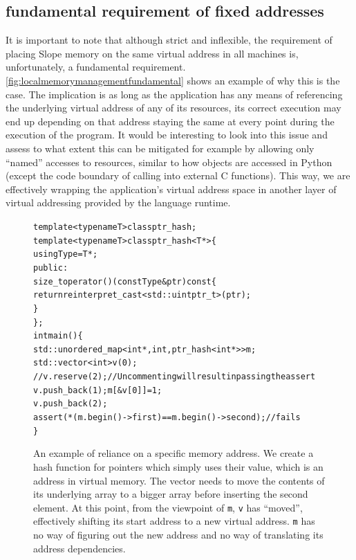 \subsection{fundamental requirement of fixed addresses}
\label{sec:fixedfundamental}
It is important to note that although strict and inflexible, the requirement of
placing Slope memory on the same virtual address in all machines is,
unfortunately, a fundamental requirement. \autoref{fig:localmemorymanagementfundamental}
shows an example of why this is the case. The implication is as long as the
application has any means of referencing the underlying virtual address of any
of its resources, its correct execution may end up depending on that address
staying the same at every point during the execution of the program. It would
be interesting to look into this issue and assess to what extent this can be
mitigated for example by allowing only ``named'' accesses to resources, similar
to how objects are accessed in Python (except the code boundary of calling into
external C functions). This way, we are effectively wrapping the application's
virtual address space in another layer of virtual addressing provided by the
language runtime.


\begin{figure}[tp]
\begin{alltt}

template<typename T> class ptr_hash;
template<typename T> class ptr_hash<T*> \{
  using Type = T*;
 public:
  size_t operator()(const Type& ptr) const \{
    return reinterpret_cast<std::uintptr_t>(ptr);
  \}
\};
int main() \{
  std::unordered_map<int*, int, ptr_hash<int*>> m;
  std::vector<int> v(0);
  // v.reserve(2); // Uncommenting will result in passing the assert
  v.push_back(1); m[&v[0]] = 1;
  v.push_back(2);
  assert(*(m.begin()->first) == m.begin()->second); // fails
\}

\end{alltt}
\caption{
    An example of reliance on a specific memory address. We create a hash
    function for pointers which simply uses their value, which is an address
    in virtual memory. The vector needs to move the contents of its underlying array to a
    bigger array before inserting the second element. At this point, from the viewpoint of
    \texttt{m}, \texttt{v} has ``moved'', effectively shifting its start
    address to a new virtual address. \texttt{m} has no way of figuring out
    the new address and no way of translating its address dependencies.
}
\label{fig:localmemorymanagementfundamental}
\end{figure}






